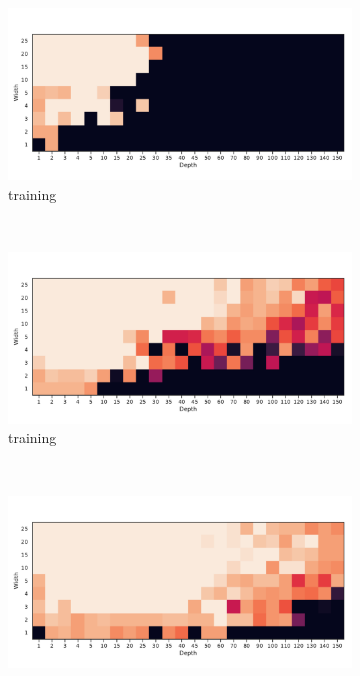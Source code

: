 \begin{figure}
  \centering
    \begin{subfigure}[b]{0.3\textwidth}
        \includegraphics[width=\textwidth]{img/moons_grid/acc-relu.pdf}
        \caption{\ReLU training}
        \label{fig:moons_grid_relu}
    \end{subfigure}
    ~ %
    \centering
    \begin{subfigure}[b]{0.3\textwidth}
        \includegraphics[width=\textwidth]{img/moons_grid/acc-relu-bn.pdf}
        \caption{\ReLUBN training}
        \label{fig:moons_grid_relubn}
    \end{subfigure}
    ~ %
    \centering
    \begin{subfigure}[b]{0.3\textwidth}
        \includegraphics[width=\textwidth]{img/moons_grid/acc-sep-up-0-0001.pdf}

\end{subfigure}
\end{figure}

